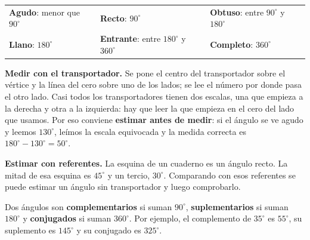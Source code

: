 \documentclass[11pt]{article}
\begin{document}
\begin{center}
\begin{tabular}{lll}
\textbf{Agudo}: menor que $90^\circ$ & \textbf{Recto}: $90^\circ$ & \textbf{Obtuso}: entre $90^\circ$ y $180^\circ$\\
\textbf{Llano}: $180^\circ$ & \textbf{Entrante}: entre $180^\circ$ y $360^\circ$ & \textbf{Completo}: $360^\circ$
\end{tabular}
\end{center}

\textbf{Medir con el transportador.} Se pone el centro del transportador sobre el vértice y la
línea del cero sobre uno de los lados; se lee el número por donde pasa el otro lado. Casi todos
los transportadores tienen dos escalas, una que empieza a la derecha y otra a la izquierda: hay
que leer la que empieza en el cero del lado que usamos. Por eso conviene \textbf{estimar antes de
medir}: si el ángulo se ve agudo y leemos $130^\circ$, leímos la escala equivocada y la medida
correcta es $180^\circ - 130^\circ = 50^\circ$.

\textbf{Estimar con referentes.} La esquina de un cuaderno es un ángulo recto. La mitad de esa
esquina es $45^\circ$ y un tercio, $30^\circ$. Comparando con esos referentes se puede estimar un
ángulo sin transportador y luego comprobarlo.

\begin{definicion}
Dos ángulos son \textbf{complementarios} si suman $90^\circ$, \textbf{suplementarios} si suman
$180^\circ$ y \textbf{conjugados} si suman $360^\circ$. Por ejemplo, el complemento de
$35^\circ$ es $55^\circ$, su suplemento es $145^\circ$ y su conjugado es $325^\circ$.
\end{definicion}
\end{document}
